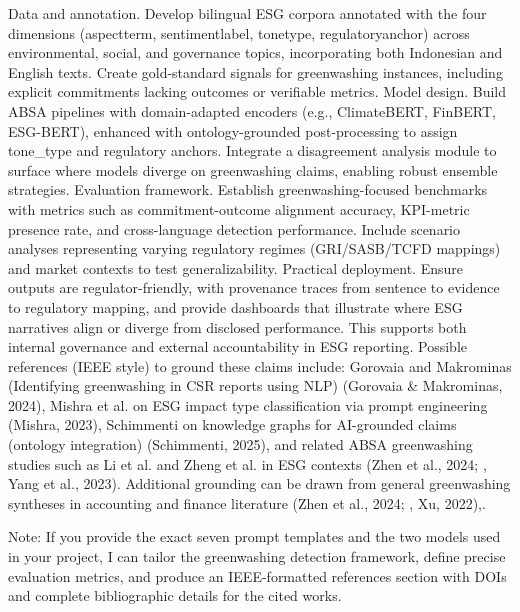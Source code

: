 Data and annotation. Develop bilingual ESG corpora annotated with the four dimensions (aspectterm, sentimentlabel, tonetype, regulatoryanchor) across environmental, social, and governance topics, incorporating both Indonesian and English texts. Create gold-standard signals for greenwashing instances, including explicit commitments lacking outcomes or verifiable metrics.
Model design. Build ABSA pipelines with domain-adapted encoders (e.g., ClimateBERT, FinBERT, ESG-BERT), enhanced with ontology-grounded post-processing to assign tone_type and regulatory anchors. Integrate a disagreement analysis module to surface where models diverge on greenwashing claims, enabling robust ensemble strategies.
Evaluation framework. Establish greenwashing-focused benchmarks with metrics such as commitment-outcome alignment accuracy, KPI-metric presence rate, and cross-language detection performance. Include scenario analyses representing varying regulatory regimes (GRI/SASB/TCFD mappings) and market contexts to test generalizability.
Practical deployment. Ensure outputs are regulator-friendly, with provenance traces from sentence to evidence to regulatory mapping, and provide dashboards that illustrate where ESG narratives align or diverge from disclosed performance. This supports both internal governance and external accountability in ESG reporting.
Possible references (IEEE style) to ground these claims include: Gorovaia and Makrominas (Identifying greenwashing in CSR reports using NLP) (Gorovaia & Makrominas, 2024), Mishra et al. on ESG impact type classification via prompt engineering (Mishra, 2023), Schimmenti on knowledge graphs for AI-grounded claims (ontology integration) (Schimmenti, 2025), and related ABSA greenwashing studies such as Li et al. and Zheng et al. in ESG contexts (Zhen et al., 2024; , Yang et al., 2023). Additional grounding can be drawn from general greenwashing syntheses in accounting and finance literature (Zhen et al., 2024; , Xu, 2022),.

Note: If you provide the exact seven prompt templates and the two models used in your project, I can tailor the greenwashing detection framework, define precise evaluation metrics, and produce an IEEE-formatted references section with DOIs and complete bibliographic details for the cited works.